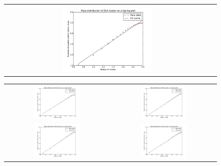 \documentclass[a4paper,12pt]{article}
\begin{document}
\begin{figure}[H]
\begin{tabular}{@{}cc@{}}
                \includegraphics[width = 0.45\textwidth]{pics/Fractal_dimension_final_6.pdf} \\
	\end{tabular}
\end{figure}
\begin{figure}[H]
\centering
        \begin{tabular}{@{}cc@{}}
                \includegraphics[width = 0.45\textwidth]{pics/Fractal_dimension_final_7.pdf} &
                \includegraphics[width = 0.45\textwidth]{pics/Fractal_dimension_final_8.pdf} \\
		\includegraphics[width = 0.45\textwidth]{pics/Fractal_dimension_final_9.pdf} &
		\includegraphics[width = 0.45\textwidth]{pics/Fractal_dimension_final_10.pdf} \\

\end{tabular}
\end{figure}
\end{document}
